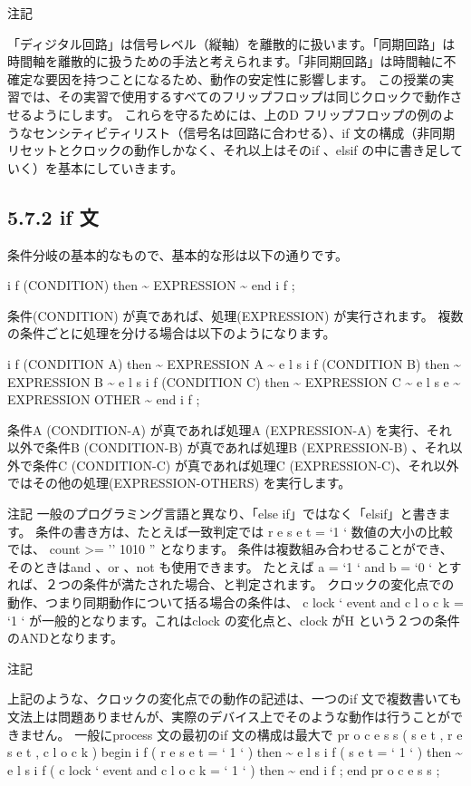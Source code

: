 \documentclass[letterpaper,10pt,dvipdfmx]{sphinxmanual}
\begin{document}
注記

「ディジタル回路」は信号レベル（縦軸）を離散的に扱います。「同期回路」は時間軸を離散的に扱うための手法と考えられます。「非同期回路」は時間軸に不確定な要因を持つことになるため、動作の安定性に影響します。
この授業の実習では、その実習で使用するすべてのフリップフロップは同じクロックで動作させるようにします。
これらを守るためには、上のD フリップフロップの例のようなセンシティビティリスト（信号名は回路に合わせる）、if 文の構成（非同期リセットとクロックの動作しかなく、それ以上はそのif 、elsif の中に書き足していく）を基本にしていきます。


\subsection{5.7.2 if 文}
\label{05_try:id10}
条件分岐の基本的なもので、基本的な形は以下の通りです。

i f (CONDITION) then
\textasciitilde{} EXPRESSION \textasciitilde{}
end i f ;

条件(CONDITION) が真であれば、処理(EXPRESSION) が実行されます。
複数の条件ごとに処理を分ける場合は以下のようになります。

i f (CONDITION A) then
\textasciitilde{} EXPRESSION A \textasciitilde{}
e l s i f (CONDITION B) then
\textasciitilde{} EXPRESSION B \textasciitilde{}
e l s i f (CONDITION C) then
\textasciitilde{} EXPRESSION C \textasciitilde{}
e l s e
\textasciitilde{} EXPRESSION OTHER \textasciitilde{}
end i f ;

条件A (CONDITION-A) が真であれば処理A (EXPRESSION-A) を実行、それ以外で条件B (CONDITION-B) が真であれば処理B (EXPRESSION-B) 、それ以外で条件C (CONDITION-C) が真であれば処理C (EXPRESSION-C)、それ以外ではその他の処理(EXPRESSION-OTHERS) を実行します。

注記
一般のプログラミング言語と異なり、「else if」ではなく「elsif」と書きます。
条件の書き方は、たとえば一致判定では
r e s e t = `1 `
数値の大小の比較では、
count \textgreater{}= '' 1010 ''
となります。
条件は複数組み合わせることができ、そのときはand 、or 、not も使用できます。
たとえば
a = `1 ` and b = `0 `
とすれば、２つの条件が満たされた場合、と判定されます。
クロックの変化点での動作、つまり同期動作について括る場合の条件は、
c lock ` event and c l o c k = `1 `
が一般的となります。これはclock の変化点と、clock がH という２つの条件のANDとなります。

注記

上記のような、クロックの変化点での動作の記述は、一つのif 文で複数書いても文法上は問題ありませんが、実際のデバイス上でそのような動作は行うことができません。
一般にprocess 文の最初のif 文の構成は最大で
pr o c e s s ( s e t , r e s e t , c l o c k )
begin
i f ( r e s e t = ` 1 ` ) then
\textasciitilde{}
e l s i f ( s e t = ` 1 ` ) then
\textasciitilde{}
e l s i f ( c lock ` event and c l o c k = ` 1 ` ) then
\textasciitilde{}
end i f ;
end pr o c e s s ;
\end{document}
